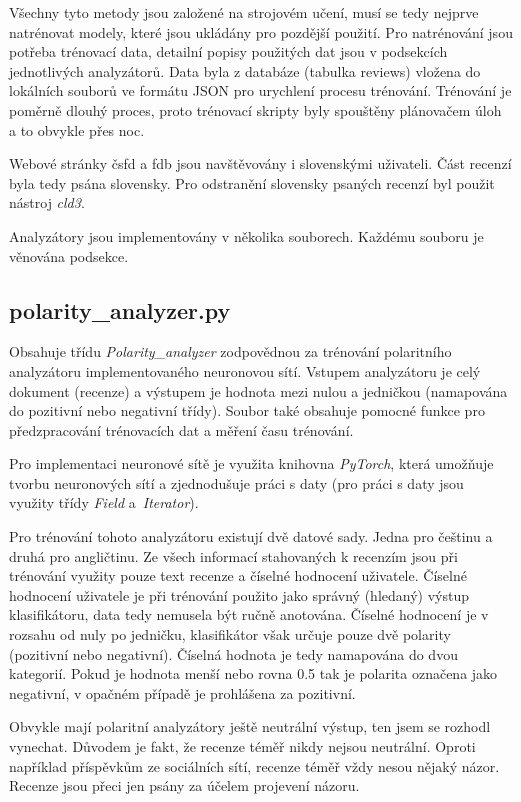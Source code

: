 Všechny tyto metody jsou založené na strojovém učení, musí se tedy nejprve natrénovat modely, které jsou ukládány pro pozdější použití. Pro natrénování jsou potřeba trénovací data, detailní popisy použitých dat jsou v podsekcích jednotlivých analyzátorů. Data byla z databáze (tabulka reviews) vložena do lokálních souborů ve formátu JSON pro urychlení procesu trénování. Trénování je poměrně dlouhý proces, proto trénovací skripty byly spouštěny plánovačem úloh a to obvykle přes noc. 

Webové stránky čsfd a fdb jsou navštěvovány i slovenskými uživateli. Část recenzí byla tedy psána slovensky. Pro odstranění slovensky psaných recenzí byl použit nástroj \emph{cld3}.

Analyzátory jsou implementovány v několika souborech. Každému souboru je věnována podsekce.

\subsection{polarity\_analyzer.py}
Obsahuje třídu \emph{Polarity\_analyzer} zodpovědnou za trénování polaritního analyzátoru implementovaného neuronovou sítí. Vstupem analyzátoru je celý dokument (recenze) a výstupem je hodnota mezi nulou a jedničkou (namapována do pozitivní nebo negativní třídy). Soubor také obsahuje pomocné funkce pro předzpracování trénovacích dat a měření času trénování. 

Pro implementaci neuronové sítě je využita knihovna \emph{PyTorch}, která umožňuje tvorbu neuronových sítí a zjednodušuje práci s daty (pro práci s daty jsou využity třídy \emph{Field} a~\emph{Iterator}).

Pro trénování tohoto analyzátoru existují dvě datové sady. Jedna pro češtinu a druhá pro angličtinu. Ze všech informací stahovaných k recenzím jsou při trénování využity pouze text recenze a číselné hodnocení uživatele. Číselné hodnocení uživatele je při trénování použito jako správný (hledaný) výstup klasifikátoru, data tedy nemusela být ručně anotována. Číselné hodnocení je v rozsahu od nuly po jedničku, klasifikátor však určuje pouze dvě polarity (pozitivní nebo negativní). Číselná hodnota je tedy namapována do dvou kategorií. Pokud je hodnota menší nebo rovna 0.5 tak je polarita označena jako negativní, v opačném případě je prohlášena za pozitivní.

Obvykle mají polaritní analyzátory ještě neutrální výstup, ten jsem se rozhodl vynechat. Důvodem je fakt, že recenze téměř nikdy nejsou neutrální. Oproti například příspěvkům ze sociálních sítí, recenze téměř vždy nesou nějaký názor. Recenze jsou přeci jen psány za účelem projevení názoru.

